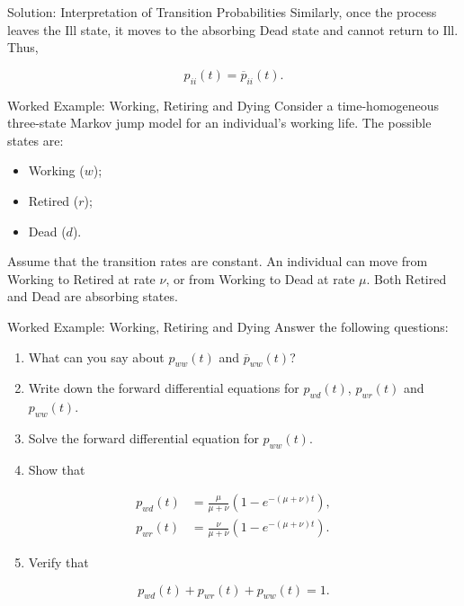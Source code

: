 \documentclass[
  ignorenonframetext,
  aspectratio=169,
]{beamer}
\providecommand{\tightlist}{%
  \setlength{\itemsep}{0pt}\setlength{\parskip}{0pt}}
\begin{document}
\begin{frame}{Solution: Interpretation of Transition Probabilities}
\protect{}\label{solution-interpretation-of-transition-probabilities-1}
Similarly, once the process leaves the Ill state, it moves to the
absorbing Dead state and cannot return to Ill. Thus,

\[
\boxed{
p_{ii}(t)=\overline p_{ii}(t).
}
\]
\end{frame}

\begin{frame}{Worked Example: Working, Retiring and Dying}
\protect{}\label{worked-example-working-retiring-and-dying}
Consider a time-homogeneous three-state Markov jump model for an
individual's working life. The possible states are:

\begin{itemize}
\tightlist
\item
  Working (\(w\));
\item
  Retired (\(r\));
\item
  Dead (\(d\)).
\end{itemize}

Assume that the transition rates are constant. An individual can move
from Working to Retired at rate \(\nu\), or from Working to Dead at rate
\(\mu\). Both Retired and Dead are absorbing states.
\end{frame}

\begin{frame}{Worked Example: Working, Retiring and Dying}
\protect{}\label{worked-example-working-retiring-and-dying-1}
Answer the following questions:

\begin{enumerate}
\tightlist
\item
  What can you say about \(p_{ww}(t)\) and \(\overline p_{ww}(t)\)?
\item
  Write down the forward differential equations for \(p_{wd}(t)\),
  \(p_{wr}(t)\) and \(p_{ww}(t)\).
\item
  Solve the forward differential equation for \(p_{ww}(t)\).
\item
  Show that
\end{enumerate}

\[
\begin{aligned}
p_{wd}(t)
&=\frac{\mu}{\mu+\nu}
\left(1-e^{-(\mu+\nu)t}\right),\\
p_{wr}(t)
&=\frac{\nu}{\mu+\nu}
\left(1-e^{-(\mu+\nu)t}\right).
\end{aligned}
\]

\begin{enumerate}
\setcounter{enumi}{4}
\tightlist
\item
  Verify that
\end{enumerate}

\[
p_{wd}(t)+p_{wr}(t)+p_{ww}(t)=1.
\]
\end{frame}
\end{document}
